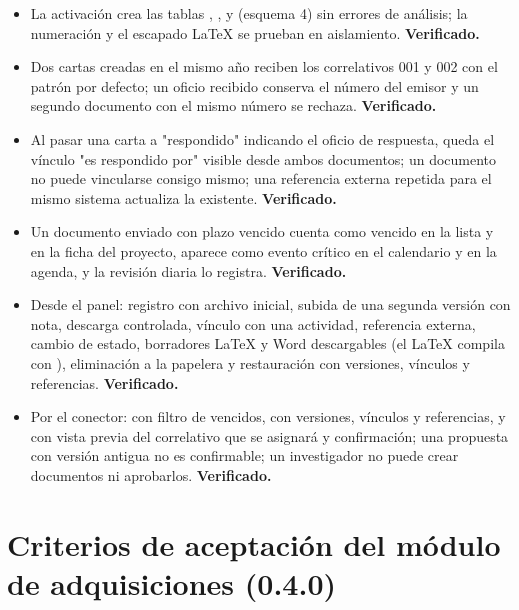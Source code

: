 \documentclass[11pt,a4paper]{article}
\begin{document}
\begin{itemize}
\item La activación crea las tablas , ,  y  (esquema 4) sin errores de análisis; la numeración y el escapado LaTeX se prueban en aislamiento. \textbf{Verificado.}
\item Dos cartas creadas en el mismo año reciben los correlativos 001 y 002 con el patrón por defecto; un oficio recibido conserva el número del emisor y un segundo documento con el mismo número se rechaza. \textbf{Verificado.}
\item Al pasar una carta a "respondido" indicando el oficio de respuesta, queda el vínculo "es respondido por" visible desde ambos documentos; un documento no puede vincularse consigo mismo; una referencia externa repetida para el mismo sistema actualiza la existente. \textbf{Verificado.}
\item Un documento enviado con plazo vencido cuenta como vencido en la lista y en la ficha del proyecto, aparece como evento crítico en el calendario y en la agenda, y la revisión diaria lo registra. \textbf{Verificado.}
\item Desde el panel: registro con archivo inicial, subida de una segunda versión con nota, descarga controlada, vínculo con una actividad, referencia externa, cambio de estado, borradores LaTeX y Word descargables (el LaTeX compila con ), eliminación a la papelera y restauración con versiones, vínculos y referencias. \textbf{Verificado.}
\item Por el conector:  con filtro de vencidos,  con versiones, vínculos y referencias, y  con vista previa del correlativo que se asignará y confirmación; una propuesta con versión antigua no es confirmable; un investigador no puede crear documentos ni aprobarlos. \textbf{Verificado.}
\end{itemize}

\section{Criterios de aceptación del módulo de adquisiciones (0.4.0)}
\end{document}
